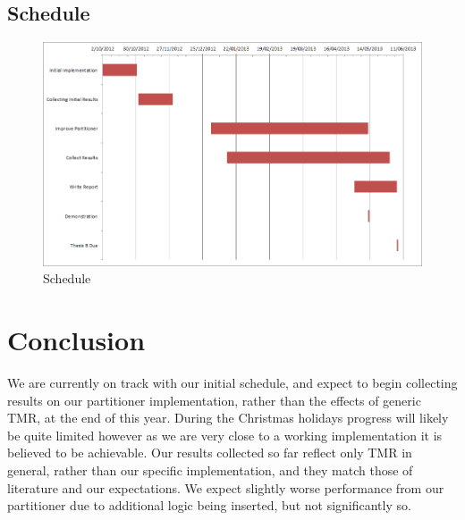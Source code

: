 \documentclass[12pt,final,oneside]{memoir} %
\begin{document}
\section{Schedule}
\begin{figure}
    \begin{center}
        \includegraphics[width=\textwidth]{images/schedule.png}
        \caption{Schedule}
        \label{Schedule}
    \end{center}
\end{figure}

\chapter{Conclusion}
We are currently on track with our initial schedule, and expect to begin collecting results on our partitioner implementation, rather than the effects of generic \ac{TMR}, at the end of this year. During the Christmas holidays progress will likely be quite limited however as we are very close to a working implementation it is believed to be achievable.
Our results collected so far reflect only \ac{TMR} in general, rather than our specific implementation, and they match those of literature and our expectations. We expect slightly worse performance from our partitioner due to additional logic being inserted, but not significantly so.

\appendix
\end{document}

